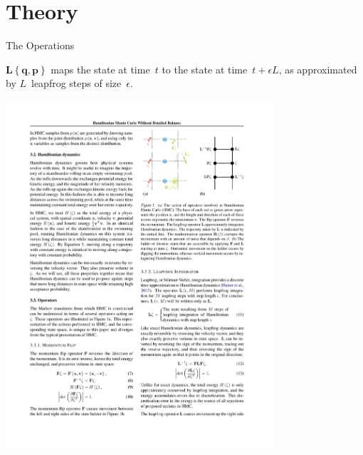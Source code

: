 \documentclass{beamer}
\renewcommand{\vec}[1]{\ensuremath{\mathbf{#1}}}
\newcommand{\op}[1]{\ensuremath{\mathbf{#1}}}
\begin{document}
    \section{Theory}

    \begin{frame}

    \end{frame}

    \begin{frame}{The Operations}

        \begin{definition}
            $\op{L}\left\{\vec{q},\vec{p}\right\}$ maps the state at time~$t$ to the state at time~$t + \epsilon L$, as approximated by $L$~leapfrog steps of size~$\epsilon$.
        \end{definition}

        \vfill

        \centering
        \includegraphics[width=0.75\textwidth]{L.pdf}

    \end{frame}
\end{document}
